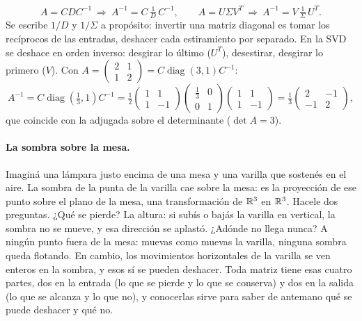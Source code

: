 \begin{resultado}
\[
  A=CDC^{-1}\ \Rightarrow\ A^{-1}=C\,\tfrac1D\,C^{-1},\qquad
  A=U\Sigma V^T\ \Rightarrow\ A^{-1}=V\,\tfrac1\Sigma\,U^T .
\]
Se escribe \(1/D\) y \(1/\Sigma\) a propósito: invertir una matriz diagonal es
tomar los recíprocos de las entradas, deshacer cada estiramiento por separado. En la SVD
se deshace en orden inverso: desgirar lo último (\(U^T\)), desestirar, desgirar lo primero
(\(V\)). Con \(A=\begin{pmatrix}2&1\\1&2\end{pmatrix}=C\operatorname{diag}(3,1)C^{-1}\):
\[
  A^{-1}=C\operatorname{diag}(\tfrac13,1)C^{-1}
  =\tfrac12\begin{pmatrix}1&1\\1&-1\end{pmatrix}\begin{pmatrix}\tfrac13&0\\0&1\end{pmatrix}
  \begin{pmatrix}1&1\\1&-1\end{pmatrix}
  =\tfrac13\begin{pmatrix}2&-1\\-1&2\end{pmatrix},
\]
que coincide con la adjugada sobre el determinante (\(\det A=3\)).
\end{resultado}

\paragraph{La sombra sobre la mesa.} Imaginá una lámpara justo encima de una mesa y una
varilla que sostenés en el aire. La sombra de la punta de la varilla cae sobre la mesa: es la
proyección de ese punto sobre el plano de la mesa, una transformación de \(\mathbb{R}^3\) en \(\mathbb{R}^3\).
Hacele dos preguntas. ¿Qué se pierde? La altura: si subís o bajás la varilla en vertical, la
sombra no se mueve, y esa dirección se aplastó. ¿Adónde no llega nunca? A ningún punto fuera
de la mesa: muevas como muevas la varilla, ninguna sombra queda flotando. En cambio, los
movimientos horizontales de la varilla se ven enteros en la sombra, y esos sí se pueden
deshacer. Toda matriz tiene esas cuatro partes, dos en la entrada (lo que se pierde y lo que se
conserva) y dos en la salida (lo que se alcanza y lo que no), y conocerlas sirve para saber de
antemano qué se puede deshacer y qué no.

